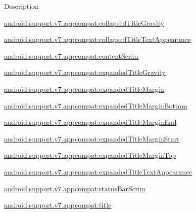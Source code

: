Description 

{\ttfamily \hyperlink{classandroid_1_1support_1_1v7_1_1appcompat_1_1R_1_1styleable_aca00ebe0643a3a5ded86879fbff26955}{android.\+support.\+v7.\+appcompat\+:collapsed\+Title\+Gravity}}

{\ttfamily \hyperlink{classandroid_1_1support_1_1v7_1_1appcompat_1_1R_1_1styleable_af3614fd0af2e5e72723efefdb3be481a}{android.\+support.\+v7.\+appcompat\+:collapsed\+Title\+Text\+Appearance}}

{\ttfamily \hyperlink{classandroid_1_1support_1_1v7_1_1appcompat_1_1R_1_1styleable_a9bd6e1eb8c17d8f0f33567b77c829a5a}{android.\+support.\+v7.\+appcompat\+:content\+Scrim}}

{\ttfamily \hyperlink{classandroid_1_1support_1_1v7_1_1appcompat_1_1R_1_1styleable_adbe8dfae693ce3de1ae6617648f8652c}{android.\+support.\+v7.\+appcompat\+:expanded\+Title\+Gravity}}

{\ttfamily \hyperlink{classandroid_1_1support_1_1v7_1_1appcompat_1_1R_1_1styleable_aa0c9f6ddca433d8759b5d37b92f038f0}{android.\+support.\+v7.\+appcompat\+:expanded\+Title\+Margin}}

{\ttfamily \hyperlink{classandroid_1_1support_1_1v7_1_1appcompat_1_1R_1_1styleable_a9921e0babb5ad3a5043223af603a47c0}{android.\+support.\+v7.\+appcompat\+:expanded\+Title\+Margin\+Bottom}}

{\ttfamily \hyperlink{classandroid_1_1support_1_1v7_1_1appcompat_1_1R_1_1styleable_ad4ab1dac8092468e823d2ec10e403b6c}{android.\+support.\+v7.\+appcompat\+:expanded\+Title\+Margin\+End}}

{\ttfamily \hyperlink{classandroid_1_1support_1_1v7_1_1appcompat_1_1R_1_1styleable_a1f5a83e047a2bec57c2d0fe4f5fff481}{android.\+support.\+v7.\+appcompat\+:expanded\+Title\+Margin\+Start}}

{\ttfamily \hyperlink{classandroid_1_1support_1_1v7_1_1appcompat_1_1R_1_1styleable_a0d5fd646e714ea1e44ffb383a0fff8cf}{android.\+support.\+v7.\+appcompat\+:expanded\+Title\+Margin\+Top}}

{\ttfamily \hyperlink{classandroid_1_1support_1_1v7_1_1appcompat_1_1R_1_1styleable_af1872845d84b104e9c1a63abd2fadcd0}{android.\+support.\+v7.\+appcompat\+:expanded\+Title\+Text\+Appearance}}

{\ttfamily \hyperlink{classandroid_1_1support_1_1v7_1_1appcompat_1_1R_1_1styleable_a8dd3d1989f1de8df8670da0cf881bb53}{android.\+support.\+v7.\+appcompat\+:status\+Bar\+Scrim}}

{\ttfamily \hyperlink{classandroid_1_1support_1_1v7_1_1appcompat_1_1R_1_1styleable_a287b485120735165da1ae86c6c16c174}{android.\+support.\+v7.\+appcompat\+:title}}

